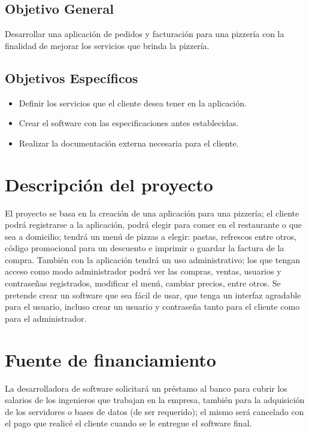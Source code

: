 \documentclass[conference]{IEEEtran}
\begin{document}
\subsection{Objetivo General}

Desarrollar una aplicación de pedidos y facturación para una pizzería con la finalidad de mejorar los servicios que brinda la pizzería.

\subsection{Objetivos Específicos}
\begin{itemize}
\item Definir los servicios que el cliente desea tener en la aplicación.
\item Crear el software con las especificaciones antes establecidas.
\item Realizar la documentación externa necesaria para el cliente.
\end{itemize}


\section{Descripción del proyecto}

El proyecto se basa en la creación de una aplicación para una pizzería; el cliente podrá registrarse a la aplicación, podrá elegir para comer en el restaurante o que sea a domicilio; tendrá un menú de pizzas a elegir: pastas, refrescos entre otros, código promocional para un descuento e imprimir o guardar la factura de la compra. 
También con la aplicación tendrá un uso administrativo; los que tengan acceso como modo administrador podrá ver las compras, ventas, usuarios y contraseñas registrados, modificar el menú, cambiar precios, entre otros.
Se pretende crear un software que sea fácil de usar, que tenga un interfaz agradable para el usuario, incluso crear un usuario y contraseña tanto para el cliente como para el administrador.

\section{Fuente de financiamiento}

La desarrolladora de software solicitará un préstamo al banco para cubrir los salarios de los ingenieros que trabajan en la empresa, también para la adquisición de los servidores o bases de datos (de ser requerido); el mismo será cancelado con el pago que realicé el cliente cuando se le entregue el software final.
\end{document}
